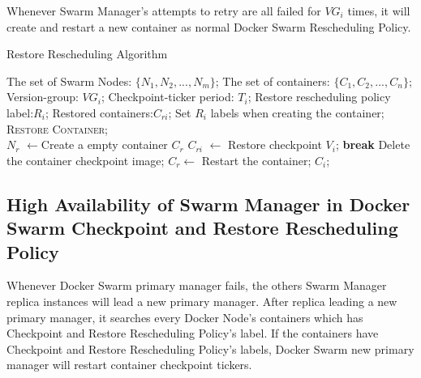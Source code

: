 Whenever Swarm Manager's attempts to retry are all failed for $ VG_i $ times, it will create and restart a new container as normal Docker Swarm Rescheduling Policy.

\begin{algorithm}[h]
    \caption{Restore Rescheduling Algorithm}
    \label{code:Restore}
    \begin{algorithmic}[1]
    	\Require
		The set of Swarm Nodes: $ \lbrace N_1,N_2,...,N_m \rbrace $;
		The set of containers: $ \lbrace C_1,C_2,...,C_n \rbrace $;
		Version-group: $ VG_i $;
		Checkpoint-ticker period: $ T_i $;
		Restore rescheduling policy label:$ R_i $;
	\Ensure
		Restored containers:$ C_{ri} $;
        \State Set $ R_i $ labels when creating the container;
        \\
        		\State \textsc{Restore Container};
        	\EndFor
        \EndIf
        \\
			\State $ N_r $ $\longleftarrow$Create a empty container $ C_r $
				\State $ C_{ri} $ $\longleftarrow$ Restore checkpoint $ V_i $;
					\State \textbf{break}
				\EndIf
			\EndFor
			\State Delete the container checkpoint image;
				\State $ C_r \longleftarrow $ Restart the container; $C_i$;
			\EndIf
		\EndProcedure
	\end{algorithmic}
\end{algorithm}

\subsection{High Availability of Swarm Manager in Docker Swarm Checkpoint and Restore Rescheduling Policy}
Whenever Docker Swarm primary manager fails, the others Swarm Manager replica instances will lead a new primary manager.
After replica leading a new primary manager, it searches every Docker Node's containers which has Checkpoint and Restore Rescheduling Policy's label.
If the containers have Checkpoint and Restore Rescheduling Policy's labels, Docker Swarm new primary manager will restart container checkpoint tickers.